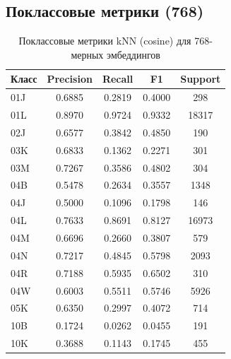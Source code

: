 \documentclass{article}
\begin{document}
\subsection{Поклассовые метрики (768)}
\begin{table}[h]
\centering
\caption{Поклассовые метрики kNN (cosine) для 768-мерных эмбеддингов}
\scriptsize
\begin{tabular}{lcccc}
\toprule
\textbf{Класс} & \textbf{Precision} & \textbf{Recall} & \textbf{F1} & \textbf{Support} \\
\midrule
01J & 0.6885 & 0.2819 & 0.4000 & 298 \\
01L & 0.8970 & 0.9724 & 0.9332 & 18317 \\
02J & 0.6577 & 0.3842 & 0.4850 & 190 \\
03K & 0.6833 & 0.1362 & 0.2271 & 301 \\
03M & 0.7267 & 0.3586 & 0.4802 & 304 \\
04B & 0.5478 & 0.2634 & 0.3557 & 1348 \\
04J & 0.5000 & 0.1096 & 0.1798 & 146 \\
04L & 0.7633 & 0.8691 & 0.8127 & 16973 \\
04M & 0.6696 & 0.2660 & 0.3807 & 579 \\
04N & 0.7217 & 0.4845 & 0.5798 & 2093 \\
04R & 0.7188 & 0.5935 & 0.6502 & 310 \\
04W & 0.6003 & 0.5511 & 0.5746 & 5926 \\
05K & 0.6350 & 0.2997 & 0.4072 & 714 \\
10B & 0.1724 & 0.0262 & 0.0455 & 191 \\
10K & 0.3688 & 0.1143 & 0.1745 & 455 \\
\bottomrule
\end{tabular}
\end{table}
\end{document}
